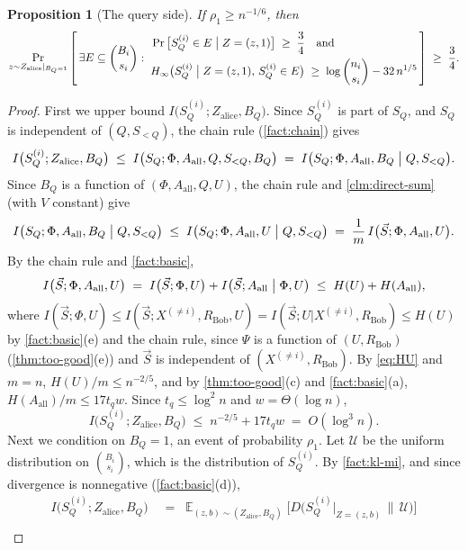 \documentclass[11pt]{article}
\theoremstyle{plain}
\newtheorem{proposition}[theorem]{Proposition}
\theoremstyle{definition}
\theoremstyle{remark}
\newcommand{\E}{\mathop{\mathbb{E}}}
\providecommand{\cU}{\mathcal{U}}
\newcommand{\Hmin}{H_\infty}
\newcommand{\vS}{\vec{S}}
\newcommand{\Aall}{A_{\mathrm{all}}}
\begin{document}
\begin{proposition}[The query side]\label{prop:S-entropy}
If $\rho_1 \ge n^{-1/6}$, then
\[ \Pr_{z \sim Z_{\mathrm{alice}}|_{B_Q=1}}\left[\, \exists E \subseteq \binom{B_i}{s_i}:\;
\begin{aligned}
&\Pr\big[S_Q^{(i)} \in E \bigm| Z = (z, 1)\big] \;\ge\; \frac34 \quad\text{and} \\
&\Hmin\big(S_Q^{(i)} \bigm| Z = (z, 1),\, S_Q^{(i)} \in E\big) \;\ge\; \log\binom{n_i}{s_i} - 32\, n^{1/5}
\end{aligned}
\,\right] \;\ge\; \frac34. \]
\end{proposition}
\begin{proof}
First we upper bound $I\big(S_Q^{(i)}; Z_{\mathrm{alice}}, B_Q\big)$. Since $S_Q^{(i)}$ is part of $S_Q$, and $S_Q$ is independent of $(Q, S_{<Q})$, the chain rule (\cref{fact:chain}) gives
\[ I\big(S_Q^{(i)}; Z_{\mathrm{alice}}, B_Q\big) \;\le\; I\big(S_Q; \Phi, \Aall, Q, S_{<Q}, B_Q\big) \;=\; I\big(S_Q; \Phi, \Aall, B_Q \bigm| Q, S_{<Q}\big). \]
Since $B_Q$ is a function of $(\Phi, \Aall, Q, U)$, the chain rule and \cref{clm:direct-sum} (with $V$ constant) give
\[ I\big(S_Q; \Phi, \Aall, B_Q \bigm| Q, S_{<Q}\big) \;\le\; I\big(S_Q; \Phi, \Aall, U \bigm| Q, S_{<Q}\big) \;=\; \frac1m\, I\big(\vS; \Phi, \Aall, U\big). \]
By the chain rule and \cref{fact:basic},
\[ I\big(\vS; \Phi, \Aall, U\big) \;=\; I\big(\vS; \Phi, U\big) + I\big(\vS; \Aall \bigm| \Phi, U\big) \;\le\; H(U) + H(\Aall), \]
where $I(\vS; \Phi, U) \le I(\vS; X^{(\ne i)}, R_{\mathrm{Bob}}, U) = I(\vS; U | X^{(\ne i)}, R_{\mathrm{Bob}}) \le H(U)$ by \cref{fact:basic}(e) and the chain rule, since $\Psi$ is a function of $(U, R_{\mathrm{Bob}})$ (\cref{thm:too-good}(e)) and $\vS$ is independent of $(X^{(\ne i)}, R_{\mathrm{Bob}})$. By \eqref{eq:HU} and $m = n$, $H(U)/m \le n^{-2/5}$, and by \cref{thm:too-good}(c) and \cref{fact:basic}(a), $H(\Aall)/m \le 17 t_q w$. Since $t_q \le \log^2 n$ and $w = \Theta(\log n)$,
\[ I\big(S_Q^{(i)}; Z_{\mathrm{alice}}, B_Q\big) \;\le\; n^{-2/5} + 17 t_q w \;=\; O(\log^3 n). \]
Next we condition on $B_Q = 1$, an event of probability $\rho_1$. Let $\cU$ be the uniform distribution on $\binom{B_i}{s_i}$, which is the distribution of $S_Q^{(i)}$. By \cref{fact:kl-mi}, and since divergence is nonnegative (\cref{fact:basic}(d)),
\begin{align*}
I\big(S_Q^{(i)}; Z_{\mathrm{alice}}, B_Q\big) \;&=\; \E_{(z, b) \sim (Z_{\mathrm{alice}}, B_Q)}\Big[D\big(S_Q^{(i)}|_{Z = (z, b)} \,\big\|\, \cU\big)\Big] \\

\end{align*}
\end{proof}
\end{document}
